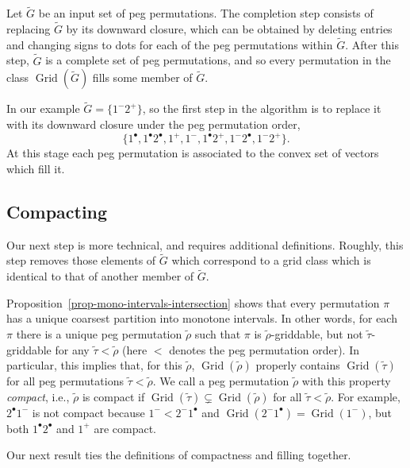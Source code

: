 \documentclass[10pt]{article}
\theoremstyle{plain}
\theoremstyle{definition}
\newcommand{\Grid}{\operatorname{Grid}}
\newcommand{\p}[1]{#1^+}
\newcommand{\m}[1]{#1^-}
\renewcommand{\d}[1]{#1^{\bullet}}
\begin{document}
Let $\tilde{G}$ be an input set of peg permutations. The completion step consists of replacing $\tilde{G}$ by its downward closure, which can be obtained by deleting entries and changing signs to dots for each of the peg permutations within $\tilde{G}$. After this step, $\tilde{G}$ is a complete set of peg permutations, and so every permutation in the class $\Grid(\tilde{G})$ fills some member of $\tilde{G}$.

In our example $\tilde{G} = \{\m 1 \p 2\}$, so the first step in the algorithm is to replace it with its downward closure under the peg permutation order,
$$
\{\d 1, \d 1 \d 2, \p 1, \m 1, \d 1 \p 2, \m 1 \d 2, \m 1 \p 2\}.
$$
At this stage each peg permutation is associated to the convex set of vectors which fill it.

\subsection{Compacting}

Our next step is more technical, and requires additional definitions. 
Roughly, this step removes those elements of $\tilde{G}$ which correspond to a grid class which is identical to that of another member of $\tilde{G}$. 

Proposition~\ref{prop-mono-intervals-intersection} shows that every permutation $\pi$ has a unique coarsest partition into monotone intervals. In other words, for each $\pi$ there is a unique peg permutation $\tilde{\rho}$ such that $\pi$ is $\tilde{\rho}$-griddable, but not $\tilde{\tau}$-griddable for any $\tilde{\tau}<\tilde{\rho}$ (here $<$ denotes the peg permutation order). In particular, this implies that, for this $\tilde{\rho}$, $\Grid(\tilde{\rho})$ properly contains $\Grid(\tilde{\tau})$ for all peg permutations $\tilde{\tau} < \tilde{\rho}$. We call a peg permutation $\tilde{\rho}$ with this property \emph{compact}, i.e., $\tilde{\rho}$ is compact if $\Grid(\tilde{\tau})\subsetneq\Grid(\tilde{\rho})$ for all $\tilde{\tau}<\tilde{\rho}$. For example, $\d{2}\m{1}$ is not compact because $\m{1}<\m{2}\d{1}$ and $\Grid(\m{2}\d{1})=\Grid(\m{1})$, but both $\d1\d2$ and $\p1$ are compact.

Our next result ties the definitions of compactness and filling together.
\end{document}

